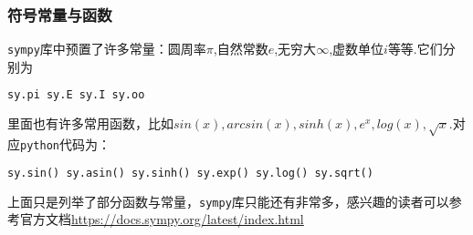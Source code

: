 \subsubsection{符号常量与函数}
\verb|sympy|库中预置了许多常量：圆周率$\pi$,自然常数$e$,无穷大$\infty$,虚数单位$i$等等.它们分别为
\begin{lstlisting}[language=python]
sy.pi sy.E sy.I sy.oo
\end{lstlisting}
里面也有许多常用函数，比如$sin(x), arcsin(x), sinh(x), e^x,
log(x),\sqrt{x}$.对应\verb|python|代码为：
\begin{lstlisting}[language=python]
sy.sin() sy.asin() sy.sinh() sy.exp() sy.log() sy.sqrt()
\end{lstlisting}
上面只是列举了部分函数与常量，\verb|sympy|库只能还有非常多，感兴趣的读者可以参考官方文档\href{https://docs.sympy.org/latest/index.html#}{https://docs.sympy.org/latest/index.html}
